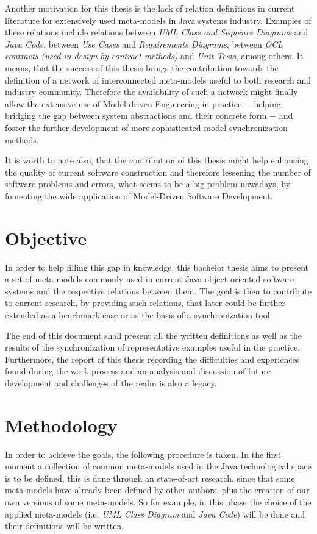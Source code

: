 \documentclass[tuberlin,cic,tc,english,noabntcite]{iiufrgs}
\begin{document}
Another motivation for this thesis is the lack of relation definitions in current literature for extensively used meta-models in Java systems industry. Examples of these relations include relations between \emph{UML Class and Sequence Diagrams} and \emph{Java Code}, between \emph{Use Cases} and \emph{Requirements Diagrams}, between \emph{OCL contracts (used in design by contract methods)} and \emph{Unit Tests}, among others. It means, that the success of this thesis brings the contribution towards the definition of a network of interconnected meta-models useful to both research and industry community. Therefore the availability of such a network might finally allow the extensive use of Model-driven Engineering in practice $-$ helping bridging the gap between system abstractions and their concrete form $-$ and foster the further development of more sophisticated model synchronization methods.

It is worth to note also, that the contribution of this thesis might help enhancing the quality of current software construction and therefore lessening the number of software problems and errors, what seems to be a big problem nowadays, by fomenting the wide application of Model-Driven Software Development.

\section{Objective}
In order to help filling this gap in knowledge, this bachelor thesis aims to present a set of meta-models commonly used in current Java object oriented software systems and the respective relations between them. The goal is then to contribute to current research, by providing such relations, that later could be further extended as a benchmark case or as the basis of a synchronization tool.

The end of this document shall present all the written definitions as well as the results of the synchronization of representative examples useful in the practice. Furthermore, the report of this thesis recording the difficulties and experiences found during the work process and an analysis and discussion of future development and challenges of the realm is also a legacy.


\section{Methodology}
In order to achieve the goals, the following procedure is taken. In the first moment a collection of common meta-models used in the Java technological space is to be defined, this is done through an state-of-art research, since that some meta-models have already been defined by other authors, plus the creation of our own versions of some meta-models. So for example, in this phase the choice of the applied meta-models (i.e. \emph{UML Class Diagram} and \emph{Java Code}) will be done and their definitions will be written.
\end{document}
